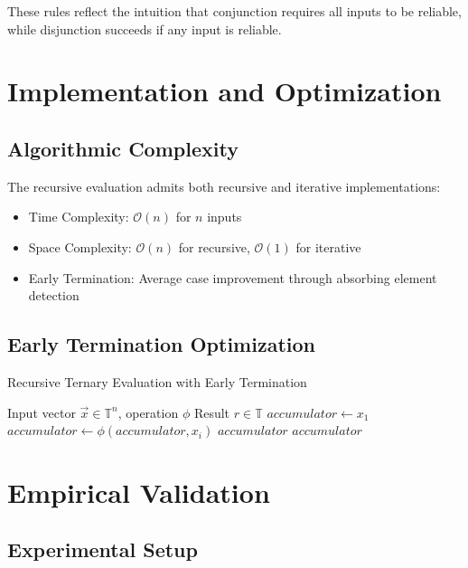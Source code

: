 \documentclass[11pt,a4paper]{article}
\begin{document}
These rules reflect the intuition that conjunction requires all inputs to be reliable, while disjunction succeeds if any input is reliable.

\section{Implementation and Optimization}

\subsection{Algorithmic Complexity}

The recursive evaluation admits both recursive and iterative implementations:

\begin{itemize}
\item Time Complexity: $\mathcal{O}(n)$ for $n$ inputs
\item Space Complexity: $\mathcal{O}(n)$ for recursive, $\mathcal{O}(1)$ for iterative
\item Early Termination: Average case improvement through absorbing element detection
\end{itemize}

\subsection{Early Termination Optimization}

\begin{algorithm}
\caption{Recursive Ternary Evaluation with Early Termination}
\begin{algorithmic}[1]
\REQUIRE Input vector $\vec{x} \in \mathbb{T}^n$, operation $\phi$
\ENSURE Result $r \in \mathbb{T}$
\STATE $accumulator \leftarrow x_1$
    \STATE $accumulator \leftarrow \phi(accumulator, x_i)$
        \RETURN $accumulator$ 
    \ENDIF
\ENDFOR
\RETURN $accumulator$
\end{algorithmic}
\end{algorithm}

\section{Empirical Validation}

\subsection{Experimental Setup}
\end{document}
